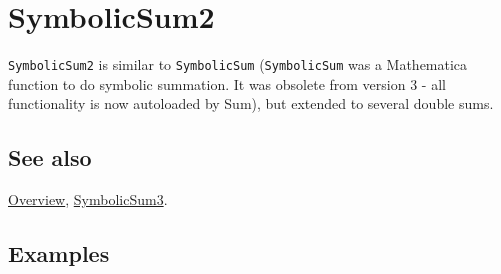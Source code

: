 \documentclass[../FeynCalcManual.tex]{subfiles}
\begin{document}
\hypertarget{symbolicsum2}{
\section{SymbolicSum2}\label{symbolicsum2}}

\texttt{SymbolicSum2} is similar to \texttt{SymbolicSum}
(\texttt{SymbolicSum} was a Mathematica function to do symbolic
summation. It was obsolete from version 3 - all functionality is now
autoloaded by Sum), but extended to several double sums.

\subsection{See also}

\hyperlink{toc}{Overview}, \hyperlink{symbolicsum3}{SymbolicSum3}.

\subsection{Examples}
\end{document}
